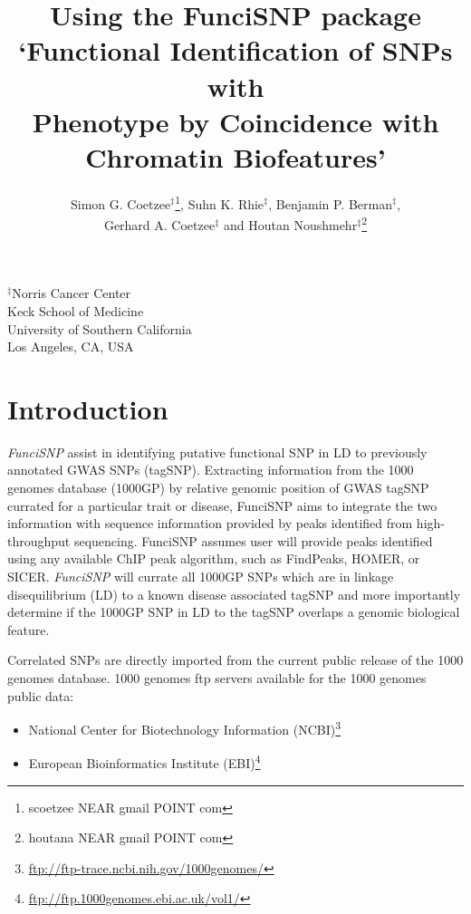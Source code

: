 \documentclass[12pt,fullpage]{article}
\author{Simon G. Coetzee$^\ddagger$\footnote{scoetzee NEAR gmail POINT com},
    Suhn K. Rhie$^\ddagger$, Benjamin P. Berman$^\ddagger$,\\Gerhard A.
        Coetzee$^\ddagger$ and Houtan Noushmehr$^\ddagger$\footnote{houtana NEAR
            gmail POINT com}}
\newcommand{\Rpackage}[1]{{\textit{#1}}}
\begin{document}
\title{Using the FunciSNP package\\`Functional Identification of SNPs with\\
Phenotype by Coincidence with Chromatin Biofeatures'}
\maketitle
\begin{center}
$^\ddagger$Norris Cancer Center\\Keck School of Medicine\\University of Southern
California\\Los Angeles, CA, USA
\end{center}
\tableofcontents
\section{Introduction}

\Rpackage{FunciSNP} assist in identifying putative functional SNP in LD to
previously annotated GWAS SNPs (tagSNP). Extracting information from the 1000
genomes database (1000GP) by relative genomic position of GWAS tagSNP currated
for a particular trait or disease, FunciSNP aims to integrate the two
information with sequence information provided by peaks identified from
high-throughput sequencing. FunciSNP assumes user will provide peaks identified
using any available ChIP peak algorithm, such as FindPeaks, HOMER, or SICER.
\Rpackage{FunciSNP} will currate all 1000GP SNPs which are in linkage
disequilibrium (LD) to a known disease associated tagSNP and more importantly
determine if the 1000GP SNP in LD to the tagSNP overlaps a genomic biological
feature.

Correlated SNPs are
directly imported from the current public release of the 1000 genomes database.
1000 genomes ftp servers available for the 1000 genomes public data: 

\begin{itemize}
\item National Center for Biotechnology Information
(NCBI)\footnote{\url{ftp://ftp-trace.ncbi.nih.gov/1000genomes/}}
\item European Bioinformatics Institute
(EBI)\footnote{\url{ftp://ftp.1000genomes.ebi.ac.uk/vol1/}}
\end{itemize}
\end{document}
